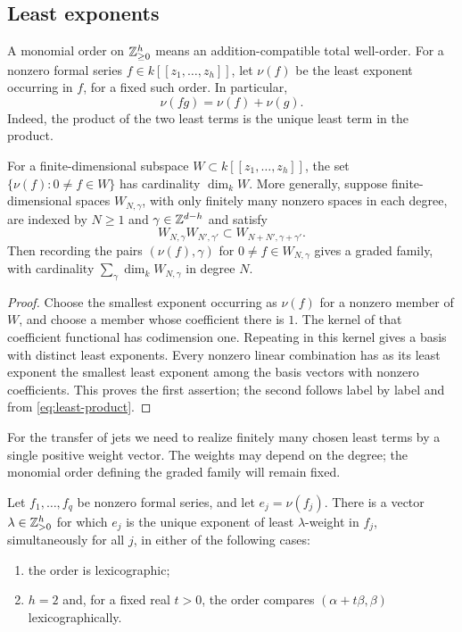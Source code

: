 \subsection{Least exponents}

A monomial order on $\mathbb Z_{\geq0}^h$ means an addition-compatible total
well-order.  For a nonzero formal series $f\in k[[z_1,\ldots,z_h]]$,
let $\nu(f)$ be the least exponent occurring in $f$, for a fixed such
order.  In particular,
\begin{equation}\label{eq:least-product}
 \nu(fg)=\nu(f)+\nu(g).
\end{equation}
Indeed, the product of the two least terms is the unique least term in
the product.

\begin{lemma}\label{lem:least-terms}
For a finite-dimensional subspace $W\subset k[[z_1,\ldots,z_h]]$, the
set $\{\nu(f):0\neq f\in W\}$ has cardinality $\dim_k W$.
More generally, suppose finite-dimensional spaces $W_{N,\gamma}$, with
only finitely many nonzero spaces in each degree, are indexed by
$N\geq1$ and $\gamma\in\mathbb Z^{d-h}$ and satisfy
\[
 W_{N,\gamma}W_{N',\gamma'}
 \subset W_{N+N',\gamma+\gamma'}.
\]
Then recording the pairs $(\nu(f),\gamma)$ for $0\neq f\in W_{N,\gamma}$
gives a graded family, with cardinality $\sum_\gamma\dim_k W_{N,\gamma}$
in degree $N$.
\end{lemma}

\begin{proof}
Choose the smallest exponent occurring as $\nu(f)$ for a nonzero member
of $W$, and choose a member whose coefficient there is $1$.  The kernel
of that coefficient functional has codimension one.  Repeating in this
kernel gives a basis with distinct least exponents.  Every nonzero linear
combination has as its least exponent the smallest least exponent among
the basis vectors with nonzero coefficients.  This proves the first
assertion; the second follows label by label and from
\eqref{eq:least-product}.
\end{proof}

For the transfer of jets we need to realize finitely many chosen least
terms by a single positive weight vector.  The weights may depend on the
degree; the monomial order defining the graded family will remain fixed.

\begin{lemma}\label{lem:exposing-weights}
Let $f_1,\ldots,f_q$ be nonzero formal series, and let $e_j=\nu(f_j)$.
There is a vector $\lambda\in\mathbb Z_{>0}^h$ for which $e_j$ is the unique
exponent of least $\lambda$-weight in $f_j$, simultaneously for all $j$,
in either of the following cases:
\begin{enumerate}[label=\textup{(\roman*)}]
\item the order is lexicographic;
\item $h=2$ and, for a fixed real $t>0$, the order compares
$(\alpha+t\beta,\beta)$ lexicographically.
\end{enumerate}
\end{lemma}

